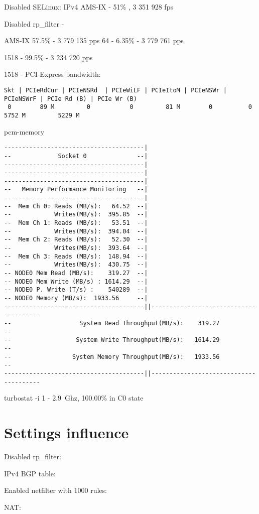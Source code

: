 Disabled SELinux:
IPv4 AMS-IX - 51\% , 3 351 928 fps

Disabled rp\_filter -

AMS-IX 57.5\% - 3 779 135 pps
64 - 6.35\% - 3 779 761 pps

1518 - 99.5\% - 3 234 720 pps

1518 - PCI-Express bandwidth:
\begin{lstlisting}
Skt | PCIeRdCur | PCIeNSRd  | PCIeWiLF | PCIeItoM | PCIeNSWr | PCIeNSWrF | PCIe Rd (B) | PCIe Wr (B)
 0        89 M         0           0         81 M        0          0          5752 M         5229 M
\end{lstlisting}

pcm-memory
\begin{lstlisting}
---------------------------------------|
--             Socket 0              --|
---------------------------------------|
---------------------------------------|
---------------------------------------|
--   Memory Performance Monitoring   --|
---------------------------------------|
--  Mem Ch 0: Reads (MB/s):   64.52  --|
--            Writes(MB/s):  395.85  --|
--  Mem Ch 1: Reads (MB/s):   53.51  --|
--            Writes(MB/s):  394.04  --|
--  Mem Ch 2: Reads (MB/s):   52.30  --|
--            Writes(MB/s):  393.64  --|
--  Mem Ch 3: Reads (MB/s):  148.94  --|
--            Writes(MB/s):  430.75  --|
-- NODE0 Mem Read (MB/s):    319.27  --|
-- NODE0 Mem Write (MB/s) : 1614.29  --|
-- NODE0 P. Write (T/s) :    540289  --|
-- NODE0 Memory (MB/s):  1933.56     --|
---------------------------------------||---------------------------------------
--                   System Read Throughput(MB/s):    319.27                  --
--                  System Write Throughput(MB/s):   1614.29                  --
--                 System Memory Throughput(MB/s):   1933.56                  --
---------------------------------------||---------------------------------------
\end{lstlisting}
turbostat -i 1 - 2.9~Ghz, 100.00\% in C0 state


\section{Settings influence}
Disabled rp\_filter:

IPv4 BGP table:

Enabled netfilter with 1000 rules:

NAT:
